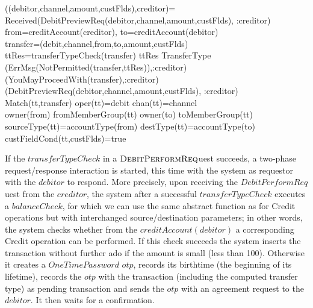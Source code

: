 \begin{asm}
((debitor,channel,amount,custFlds),creditor)=\+
  \IF Received(DebitPreviewReq(debitor,channel,amount,custFlds),
                   \FROM :creditor) \THEN \+  
     \LET from=creditAccount(creditor), to=creditAccount(debitor)\\
     \LET transfer=(debit,channel,from,to,amount,custFlds)\\  
     \LET ttRes=transferTypeCheck(transfer) \+
        \IF ttRes \not \in TransferType \THEN \+    (ErrMsg(NotPermitted(transfer,ttRes)),\TO :creditor)\-
       \ELSE~  (YouMayProceedWith(transfer),\TO :creditor)\dec\-
   (DebitPreviewReq(debitor,channel,amount,custFlds),
                   \FROM :creditor) \-
\WHERE \+
   Match(tt,transfer) \IF \+
      oper(tt)=debit \AND chan(tt)=channel \AND \\
          owner(from) \in fromMemberGroup(tt) \AND 
              owner(to) \in toMemberGroup(tt)  \AND \\
          sourceType(tt)=accountType(from) \AND destType(tt)=accountType(to) \AND \\
              custFieldCond(tt,custFlds)=true
\end{asm}


If the $transferTypeCheck$ in a $ \hbox{\sc DebitPerformReq}$uest succeeds, a two-phase request/response interaction is started, this time with the system as requestor with the $debitor$ to respond. More precisely, upon receiving the $DebitPerformReq$uest from the $creditor$, the system after a successful  $transferTypeCheck$ executes a $balanceCheck$, for which we can use the same abstract function as for Credit operations but with interchanged source/destination parameters; in other words, the system checks whether from the $creditAccount(debitor)$ a corresponding Credit operation can be performed. If this check succeeds the system inserts the transaction without further ado if the amount is small (less than 100). Otherwise it creates a $OneTimePassword$ $otp$, records its birthtime (the beginning of its lifetime), records the $otp$ with the transaction (including the computed transfer type) as pending transaction and sends the $otp$  with an agreement request to the $debitor$. It then waits for a confirmation.


